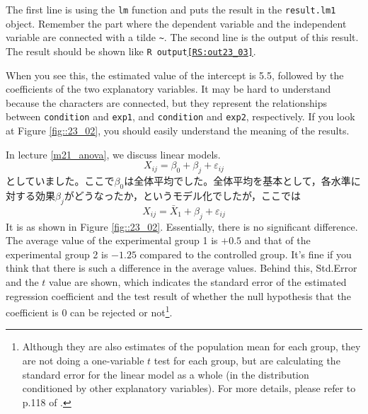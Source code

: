 \documentclass{ltjbook}
\begin{document}


The first line is using the \texttt{lm} function and puts the result in the \texttt{result.lm1} object. Remember the part where the dependent variable and the independent variable are connected with a tilde \verb|~|. The second line is the output of this result. The result should be shown like \texttt{R output\ref{RS:out23_03}}.

When you see this, the estimated value of the intercept is 5.5, followed by the coefficients of the two explanatory variables. It may be hard to understand because the characters are connected, but they represent the relationships between \texttt{condition} and \texttt{exp1}, and \texttt{condition} and \texttt{exp2}, respectively. If you look at Figure \ref{fig::23_02}, you should easily understand the meaning of the results.


In lecture \ref{m21_anova}, we discuss linear models.
\[ X_{ij} = \beta_0 + \beta_j + \varepsilon_{ij} \]
としていました。ここで$\beta_0$は全体平均でした。全体平均を基本として，各水準に対する効果$\beta_j$がどうなったか，というモデル化でしたが，ここでは
\[ X_{ij} = \bar{X}_1 + \beta_j + \varepsilon_{ij} \]
It is as shown in Figure \ref{fig::23_02}. Essentially, there is no significant difference. The average value of the experimental group 1 is $+0.5$ and that of the experimental group 2 is $-1.25$ compared to the controlled group. It's fine if you think that there is such a difference in the average values. Behind this, Std.Error and the $t$ value are shown, which indicates the standard error of the estimated regression coefficient and the test result of whether the null hypothesis that the coefficient is $0$ can be rejected or not\footnote{Although they are also estimates of the population mean for each group, they are not doing a one-variable $t$ test for each group, but are calculating the standard error for the linear model as a whole (in the distribution conditioned by other explanatory variables). For more details, please refer to p.118 of \textcite{Haebara200206}.}.
\end{document}
